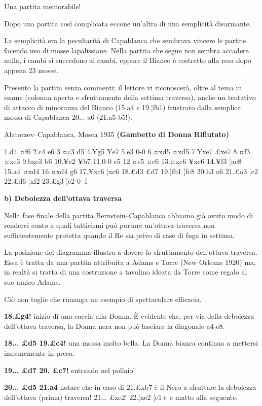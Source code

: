 Una partita memorabile!

Dopo una partita così complicata eccone un'altra di una semplicità
disarmante.

La semplicità era la peculiarità di Capablanca che sembrava vincere le
partite facendo uso di mosse lapalissiane. Nella partita che segue non
sembra accadere nulla, i cambi si succedono ai cambi, eppure il Bianco è
costretto alla resa dopo appena 23 mosse.

Presento la partita senza commenti; il lettore vi riconoscerà, oltre al
tema in esame (colonna aperta e sfruttamento della settima traversa),
anche un tentativo di attacco di minoranza del Bianco (15.a4 e 19.¦fb1)
frustrato dalla semplice mossa di Capablanca 20... a6 (21.a5 b5!).

Alatorzev--Capablanca, Mosca 1935 \textbf{(Gambetto di Donna Rifiutato)}

1.d4 ¤f6 2.c4 e6 3.¤c3 d5 4.¥g5 ¥e7 5.e3 0-0 6.¤xd5 ¤xd5 7.¥xe7 £xe7
8.¤f3 ¤xc3 9.bxc3 b6 10.¥e2 ¥b7 11.0-0 c5 12.¤e5 ¤c6 13.¤xc6 ¥xc6 14.¥f3
¦ac8 15.a4 ¤xd4 16.¤xd4 g6 17.¥xc6 ¦xc6 18.£d3 £d7 19.¦fb1 ¦fc8 20.h3 a6
21.£a3 ¦c2 22.£d6 ¦xf2 23.£g3 ¦e2 0--1

\textbf{b) Debolezza dell'ottava traversa}

Nella fase finale della partita Bernstein--Capablanca abbiamo già avuto
modo di renderci conto a quali tatticismi può portare un'ottava traversa
non sufficientemente protetta quando il Re sia privo di case di fuga in
settima.


La posizione del diagramma illustra a dovere lo sfruttamento dell'ottava
traversa. Essa è tratta da una partita attribuita a Adams e Torre (New
Orleans 1920) ma, in realtà si tratta di una costruzione a tavolino
ideata da Torre come regalo al suo amico Adams.

Ciò non toglie che rimanga un esempio di spettacolare efficacia.

\textbf{18.£g4!} inizio di una caccia alla Donna. È evidente che, per
via della debolezza dell'ottava traversa, la Donna nera non può lasciare
la diagonale a4-e8.

\textbf{18... £d5 19.£c4!} una mossa molto bella. La Donna bianca
continua a mettersi impunemente in presa.

\textbf{19... £d7 20. £c7!} entrando nel pollaio!

\textbf{20... £d5 21.a4} notare che in caso di 21.£xb7 è il Nero a
sfruttare la debolezza dell'ottava (prima) traversa! 21... £xe2! 22.¦xe2
¦c1+ e matto alla seguente.

